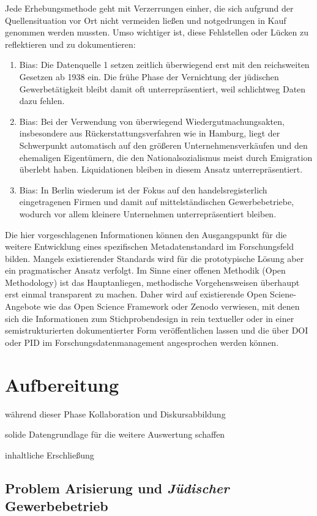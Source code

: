 Jede Erhebungsmethode geht mit Verzerrungen einher, die sich aufgrund der Quellensituation vor Ort nicht vermeiden ließen und notgedrungen in Kauf genommen werden mussten. Umso wichtiger ist, diese Fehlstellen oder Lücken zu reflektieren und zu dokumentieren:

\begin{enumerate}
    \item Bias: Die Datenquelle 1 setzen zeitlich überwiegend erst mit den reichsweiten Gesetzen ab 1938 ein. Die frühe Phase der Vernichtung der jüdischen Gewerbetätigkeit bleibt damit oft unterrepräsentiert, weil schlichtweg Daten dazu fehlen.
    \item Bias: Bei der Verwendung von überwiegend Wiedergutmachungsakten, insbesondere aus Rückerstattungsverfahren wie in Hamburg, liegt der Schwerpunkt automatisch auf den größeren Unternehmensverkäufen und den ehemaligen Eigentümern, die den Nationalsozialismus meist durch Emigration überlebt haben. Liquidationen bleiben in diesem Ansatz unterrepräsentiert. 
    \item Bias: In Berlin wiederum ist der Fokus auf den handelsregisterlich eingetragenen Firmen und damit auf mittelständischen Gewerbebetriebe, wodurch vor allem kleinere Unternehmen unterrepräsentiert bleiben.  
\end{enumerate}

Die hier vorgeschlagenen Informationen können den Ausgangspunkt für die weitere Entwicklung eines spezifischen Metadatenstandard im Forschungsfeld bilden. Mangels existierender Standards wird für die prototypische Lösung aber ein pragmatischer Ansatz verfolgt. Im Sinne einer offenen Methodik (Open Methodology) ist das Hauptanliegen, methodische Vorgehensweisen überhaupt erst einmal transparent zu machen. Daher wird auf existierende Open Sciene-Angebote wie das Open Science Framework oder Zenodo verwiesen, mit denen sich die Informationen zum Stichprobendesign in rein textueller oder in einer semistrukturierten dokumentierter Form veröffentlichen lassen und die über DOI oder PID im Forschungsdatenmanagement angesprochen werden können. 

\section{Aufbereitung}
während dieser Phase Kollaboration und Diskursabbildung

solide Datengrundlage für die weitere Auswertung schaffen

inhaltliche Erschließung
\subsection{Problem Arisierung und \textit{Jüdischer} Gewerbebetrieb}

